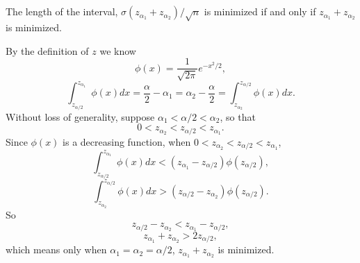 \documentclass[11pt,a4paper]{article}
\begin{document}
\subsection{}

The length of the interval, $\sigma(z_{\alpha_1}+z_{\alpha_2})/\sqrt{n}$ is minimized if and only if $z_{\alpha_1}+z_{\alpha_2}$ is minimized. 

By the definition of $z$ we know
$$\phi(x)=\frac{1}{\sqrt{2\pi}}e^{-x^2/2},$$
$$\int_{z_{\alpha/2}}^{z_{\alpha_1}}\phi(x)dx=\frac{\alpha}{2}-\alpha_1=\alpha_2-\frac{\alpha}{2}=\int^{z_{\alpha/2}}_{z_{\alpha_2}}\phi(x)dx.$$
Without loss of generality, suppose $\alpha_1<\alpha/2<\alpha_2$, so that $$0<z_{\alpha_2}<z_{\alpha/2}<z_{\alpha_1}.$$
Since $\phi(x)$ is a decreasing function, when $0<z_{\alpha_2}<z_{\alpha/2}<z_{\alpha_1}$, 
$$\int_{z_{\alpha/2}}^{z_{\alpha_1}}\phi(x)dx<(z_{\alpha_1}-z_{\alpha/2})\phi(z_{\alpha/2}),$$
$$\int^{z_{\alpha/2}}_{z_{\alpha_2}}\phi(x)dx>(z_{\alpha/2}-z_{\alpha_2})\phi(z_{\alpha/2}).$$
So $$z_{\alpha/2}-z_{\alpha_2}<z_{\alpha_1}-z_{\alpha/2},$$
$$z_{\alpha_1}+z_{\alpha_2}>2z_{\alpha/2},$$
which means only when $\alpha_1=\alpha_2=\alpha/2$, $z_{\alpha_1}+z_{\alpha_2}$ is minimized.
\end{document}

